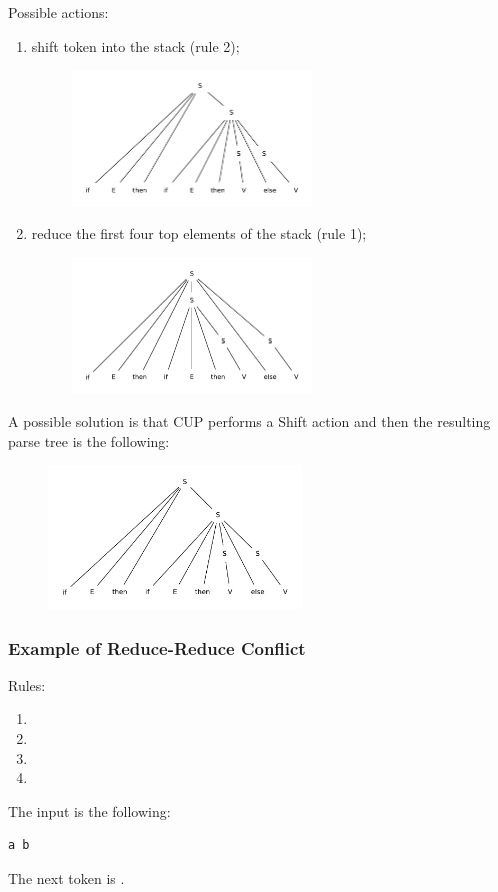 Possible actions:
\begin{enumerate}
    \item
    shift  token into the stack (rule 2);
    \begin{figure}[H]
        \centerline{\includegraphics[width=0.6\textwidth]{img/21.pdf}}
    \end{figure}
    \item
    reduce the first four top elements of the stack (rule 1);
    \begin{figure}[H]
        \centerline{\includegraphics[width=0.6\textwidth]{img/22.pdf}}
    \end{figure}
\end{enumerate}

A possible solution is that CUP performs a Shift action and then the resulting parse tree is the following:
\begin{figure}[H]
    \centerline{\includegraphics[width=0.6\textwidth]{img/23.pdf}}
\end{figure}

\subsubsection{Example of Reduce-Reduce Conflict}
Rules:
\begin{enumerate}
    \item
    \item
    \item
    \item
\end{enumerate}
The input is the following:
\begin{lstlisting}[mathescape]
a b
\end{lstlisting}
The next token is .

